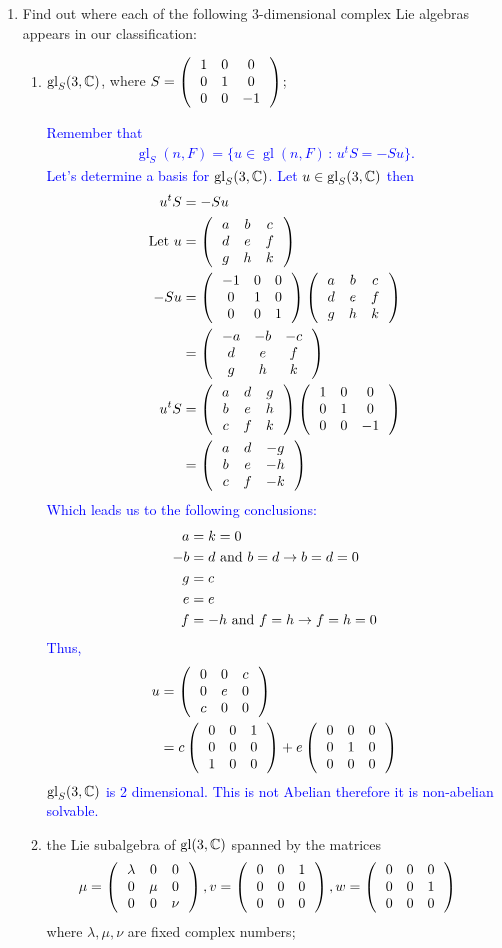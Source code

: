 \documentclass[12pt,a4paper]{report}
\newcommand{\BLUE}[1]{\textcolor{blue}{#1}}
\newcommand{\GL}{\operatorname{gl}}
\begin{document}
\begin{enumerate}[label=3.\arabic*.]
\item Find out where each of the following 3-dimensional complex Lie algebras appears in our classification:
\begin{enumerate}[label=(\roman*)]

	\item $\GL_S(3,\C)$, where $S=\left (\,  \begin{array}{c c c} 1&0&0 \\ 0 & 1 & 0 \\ 0 & 0 & -1 \end{array}  \,\right )$;
	
	\BLUE{Remember that 
	\begin{align*}
	\GL_S(n,F) = \{u \in \GL(n,F)\,:\, u^tS=-Su\}.
	\end{align*}Let's determine a basis for $\GL_S(3,\C)$.  Let $u \in \GL_S(3,\C)$  then 
	\begin{align*}
		u^tS &= -Su \\
		\text{Let } u &= \left (\,  \begin{array}{c c c} a&b&c \\ d & e & f \\ g & h & k \end{array}  \,\right ) \\
		-Su &= \left (\,  \begin{array}{c c c} -1&0&0 \\ 0 & 1 & 0 \\ 0 & 0 & 1 \end{array}  \,\right )\left (\,  \begin{array}{c c c} a&b&c \\ d & e & f \\ g & h & k \end{array}  \,\right ) \\
		&= \left (\,  \begin{array}{c c c} -a&-b&-c \\ d & e & f \\ g & h & k \end{array}  \,\right ) \\
		u^tS &= \left (\,  \begin{array}{c c c} a&d&g \\ b & e & h \\ c & f & k \end{array}  \,\right )\left (\,  \begin{array}{c c c} 1&0&0 \\ 0 & 1 & 0 \\ 0 & 0 & -1 \end{array}  \,\right ) \\
		&= \left (\,  \begin{array}{c c c} a&d&-g \\ b & e & -h \\ c & f & -k \end{array}  \,\right )
	\end{align*}Which leads us to the following conclusions:
	\begin{align*}
		a &= k = 0\\
		-b &= d \text{ and } b=d \to b=d=0 \\
		g &= c \\
		e &= e \\
		f &= -h \text{ and } f=h \to f=h=0
	\end{align*}Thus, 
	\begin{align*}
		u &= \left (\,  \begin{array}{c c c} 0&0&c \\ 0 & e & 0 \\ c & 0 & 0 \end{array}  \,\right ) \\
		&= c\left (\,  \begin{array}{c c c} 0&0&1 \\ 0 & 0 & 0 \\ 1 & 0 & 0 \end{array}  \,\right )+e\left (\,  \begin{array}{c c c} 0&0&0 \\ 0 & 1 & 0 \\ 0 & 0 & 0 \end{array}  \,\right )
	\end{align*}$\GL_S(3,\C)$ is 2 dimensional. This is not Abelian therefore it is non-abelian solvable.
	}
	
	\item the Lie subalgebra of $\GL(3,\C)$ spanned by the matrices
	\begin{align*}
		\mu &= \left (\,  \begin{array}{c c c} \lambda&0&0 \\ 0 & \mu & 0 \\ 0 & 0 & \nu \end{array}  \,\right ), v= \left (\,  \begin{array}{c c c} 0&0&1 \\ 0 & 0 & 0 \\ 0 & 0 & 0 \end{array}  \,\right ), w=\left (\,  \begin{array}{c c c} 0&0&0 \\ 0 & 0 & 1 \\ 0 & 0 & 0 \end{array}  \,\right )
	\end{align*}where $\lambda, \mu, \nu$ are fixed complex numbers;
	

\end{enumerate}
\end{enumerate}
\end{document}
